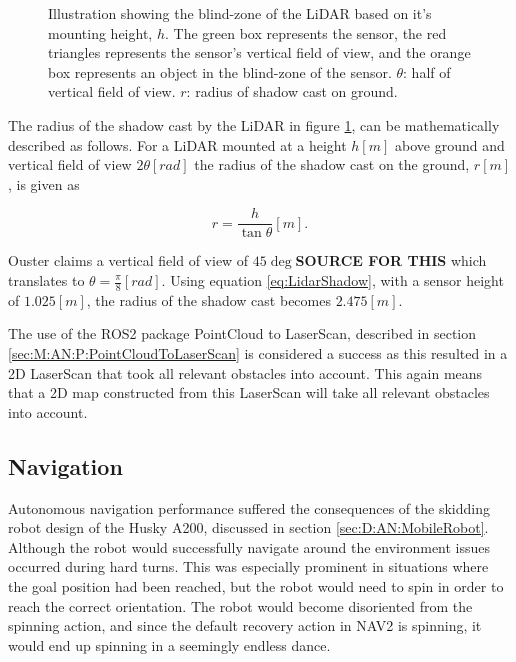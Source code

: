 \begin{figure}[ht]
  \centering
  
  \caption{Illustration showing the blind-zone of the LiDAR based on it's mounting height, $h$. The green box represents the sensor, the red triangles represents the sensor's vertical field of view, and the orange box represents an object in the blind-zone of the sensor. $\theta$: half of vertical field of view. $r$: radius of shadow cast on ground.}
  \label{fig:D:AN:P:LidarShadow}
\end{figure}

The radius of the shadow cast by the LiDAR in figure \ref{fig:D:AN:P:LidarShadow}, can be mathematically described as follows. For a LiDAR mounted at a height $h[m]$ above ground and vertical field of view $2\theta[rad]$ the radius of the shadow cast on the ground, $r[m]$, is given as

\begin{equation} \label{eq:LidarShadow}
    r = \frac{h}{\tan{\theta}}[m].
\end{equation}

Ouster claims a vertical field of view of $45\deg$\textbf{SOURCE FOR THIS} which translates to $\theta=\frac{\pi}{8}[rad]$. Using equation \ref{eq:LidarShadow}, with a sensor height of $1.025[m]$, the radius of the shadow cast becomes $2.475[m]$.

The use of the ROS2 package PointCloud to LaserScan, described in section \ref{sec:M:AN:P:PointCloudToLaserScan} is considered a success as this resulted in a 2D LaserScan that took all relevant obstacles into account. This again means that a 2D map constructed from this LaserScan will take all relevant obstacles into account.

\subsection{Navigation}\label{sec:D:AN:Navigation}
Autonomous navigation performance suffered the consequences of the skidding robot design of the Husky A200, discussed in section \ref{sec:D:AN:MobileRobot}. Although the robot would successfully navigate around the environment issues occurred during hard turns. This was especially prominent in situations where the goal position had been reached, but the robot would need to spin in order to reach the correct orientation. The robot would become disoriented from the spinning action, and since the default recovery action in NAV2 is spinning, it would end up spinning in a seemingly endless dance.

